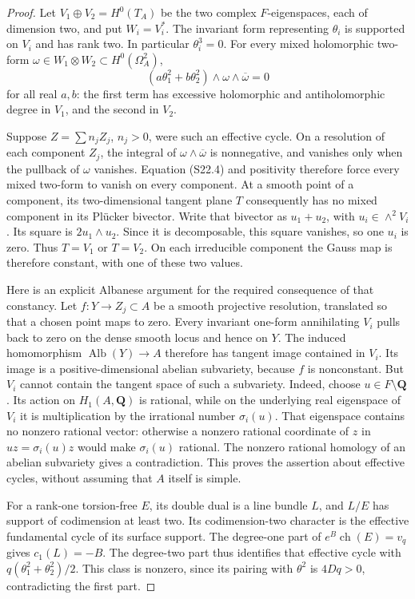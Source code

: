 \begin{proof}
Let $V_1\oplus V_2=H^0(T_A)$ be the two complex
$F$-eigenspaces, each of dimension two, and put
$W_i=V_i^*$. The invariant form representing $\theta_i$
is supported on $V_i$ and has rank two. In particular
$\theta_i^3=0$.
For every mixed holomorphic two-form
$\omega\in W_1\otimes W_2\subset H^0(\Omega_A^2)$,
\[
 (a\theta_1^2+b\theta_2^2)\wedge\omega\wedge\overline\omega=0
 \tag{S22.4}
\]
for all real $a,b$: the first term has excessive holomorphic
and antiholomorphic degree in $V_1$, and the second in $V_2$.

Suppose $Z=\sum n_jZ_j$, $n_j>0$, were such an effective
cycle. On a resolution of each component $Z_j$, the integral
of $\omega\wedge\overline\omega$ is nonnegative, and vanishes
only when the pullback of $\omega$ vanishes. Equation
(S22.4) and positivity therefore force every mixed two-form
to vanish on every component. At a smooth point of a
component, its two-dimensional tangent plane $T$ consequently
has no mixed component in its Pl\"ucker bivector.
Write that bivector as $u_1+u_2$, with
$u_i\in\wedge^2V_i$. Its square is $2u_1\wedge u_2$.
Since it is decomposable, this square vanishes, so one
$u_i$ is zero. Thus $T=V_1$ or $T=V_2$.
On each irreducible component the Gauss map is therefore
constant, with one of these two values.

Here is an explicit Albanese argument for the required
consequence of that constancy. Let $f:Y\to Z_j\subset A$
be a smooth projective resolution, translated so that a
chosen point maps to zero. Every invariant one-form
annihilating $V_i$ pulls back to zero on the dense smooth
locus and hence on $Y$. The induced homomorphism
$\operatorname{Alb}(Y)\to A$ therefore has tangent image
contained in $V_i$. Its image is a positive-dimensional
abelian subvariety, because $f$ is nonconstant. But $V_i$
cannot contain the tangent space of such a subvariety.
Indeed, choose $u\in F\setminus\mathbf Q$. Its action on
$H_1(A,\mathbf Q)$ is rational, while on the underlying
real eigenspace of $V_i$ it is multiplication by the
irrational number $\sigma_i(u)$. That eigenspace contains
no nonzero rational vector: otherwise a nonzero rational
coordinate of $z$ in $uz=\sigma_i(u)z$ would make
$\sigma_i(u)$ rational. The nonzero rational homology of
an abelian subvariety gives a contradiction.
This proves the assertion about effective cycles, without
assuming that $A$ itself is simple.

For a rank-one torsion-free $E$, its double dual is a line
bundle $L$, and $L/E$ has support of codimension at least
two. Its codimension-two character is the effective
fundamental cycle of its surface support. The degree-one
part of $e^B\operatorname{ch}(E)=v_q$ gives
$c_1(L)=-B$. The degree-two part thus identifies that
effective cycle with
$q(\theta_1^2+\theta_2^2)/2$.
This class is nonzero, since its pairing with $\theta^2$
is $4Dq>0$, contradicting the first part.


\end{proof}
